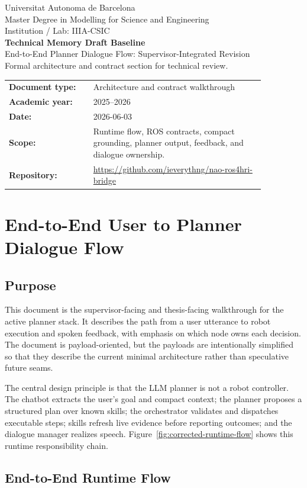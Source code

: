 \documentclass[12pt,a4paper]{article}
\newcommand{\formalcover}[4]{%
\begin{titlepage}
\centering
\vspace*{1.2cm}
{\Large Universitat Autonoma de Barcelona}\\[4pt]
{\large Master Degree in Modelling for Science and Engineering}\\[4pt]
{\large Institution / Lab: IIIA-CSIC}\\[2.0cm]
{\Huge\bfseries #1}\\[0.35cm]
{\Large #2}\\[1.5cm]
{\large Formal architecture and contract section for technical review.}\\[2.0cm]
\begin{tabular}{>{\bfseries}p{0.28\linewidth}p{0.58\linewidth}}
Document type: & Architecture and contract walkthrough\\
Academic year: & 2025--2026\\
Date: & #3\\
Scope: & #4\\
Repository: & \url{https://github.com/ieverythng/nao-ros4hri-bridge}\\
\end{tabular}
\vfill
\end{titlepage}}
\begin{document}
\formalcover{Technical Memory Draft Baseline}{End-to-End Planner Dialogue Flow: Supervisor-Integrated Revision}{2026-06-03}{Runtime flow, ROS contracts, compact grounding, planner output, feedback, and dialogue ownership.}

\section{End-to-End User to Planner Dialogue Flow}

\subsection{Purpose}

This document is the supervisor-facing and thesis-facing walkthrough for the active planner stack. It describes the path from a user utterance to robot execution and spoken feedback, with emphasis on which node owns each decision. The document is payload-oriented, but the payloads are intentionally simplified so that they describe the current minimal architecture rather than speculative future seams.

The central design principle is that the LLM planner is not a robot controller. The chatbot extracts the user's goal and compact context; the planner proposes a structured plan over known skills; the orchestrator validates and dispatches executable steps; skills refresh live evidence before reporting outcomes; and the dialogue manager realizes speech. Figure~\ref{fig:corrected-runtime-flow} shows this runtime responsibility chain.

\subsection{End-to-End Runtime Flow}
\end{document}
